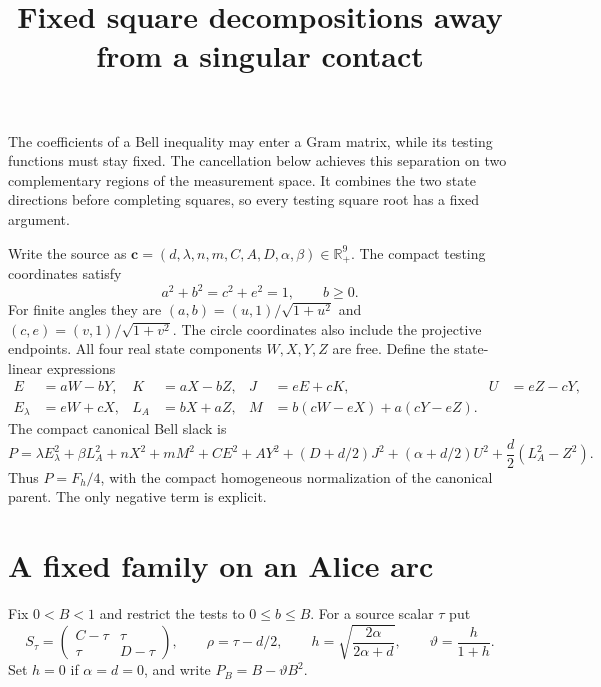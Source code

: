 \documentclass[10pt]{article}
\title{Fixed square decompositions away from a singular contact}
\author{}\date{}
\newcommand{\R}{\mathbb R}
\begin{document}
\maketitle\vspace{-2.5em}

The coefficients of a Bell inequality may enter a Gram matrix, while its
testing functions must stay fixed. The cancellation below achieves this
separation on two complementary regions of the measurement space. It
combines the two state directions before completing squares, so every
testing square root has a fixed argument.

Write the source as
$\mathbf c=(d,\lambda,n,m,C,A,D,\alpha,\beta)\in\R_+^9$.
The compact testing coordinates satisfy
\[
 a^2+b^2=c^2+e^2=1,\qquad b\geq0.
\]
For finite angles they are $(a,b)=(u,1)/\sqrt{1+u^2}$ and
$(c,e)=(v,1)/\sqrt{1+v^2}$. The circle coordinates also include the
projective endpoints. All four real state components $W,X,Y,Z$ are free.
Define the state-linear expressions
\begin{align*}
 E&=aW-bY,& K&=aX-bZ,& J&=eE+cK,& U&=eZ-cY,\\
 E_\lambda&=eW+cX,& L_A&=bX+aZ,&
 M&=b(cW-eX)+a(cY-eZ).
\end{align*}
The compact canonical Bell slack is
\begin{equation}
 P=\lambda E_\lambda^2+\beta L_A^2+nX^2+mM^2
   +CE^2+AY^2+(D+d/2)J^2+(\alpha+d/2)U^2
   +\frac d2(L_A^2-Z^2).
 \label{eq:parent}
\end{equation}
Thus $P=F_h/4$, with the compact homogeneous normalization of the
canonical parent. The only negative term is explicit.

\section{A fixed family on an Alice arc}

Fix $0<B<1$ and restrict the tests to $0\leq b\leq B$.
For a source scalar $\tau$ put
\[
 S_\tau=\begin{pmatrix}C-\tau&\tau\\ \tau&D-\tau\end{pmatrix},
 \qquad \rho=\tau-d/2,\qquad
 h=\sqrt{\frac{2\alpha}{2\alpha+d}},\qquad
 \vartheta=\frac h{1+h}.
\]
Set $h=0$ if $\alpha=d=0$, and write $P_B=B-\vartheta B^2$.
\end{document}
